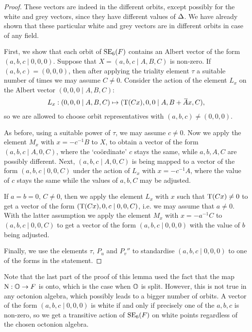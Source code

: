 \begin{proof}
	These vectors are indeed in the different orbits, except possibly for the white 
	and grey vectors, since they have different values of $\Delta$. We have already
	shown that these particular 
	white and grey vectors are in different orbits in case of any field. 
	
	First, we show that each orbit of $\mathrm{SE}_6(F)$ contains an Albert vector of the form
	$(a,b,c\mid 0,0,0)$. Suppose that $X = (a,b,c\mid A,B,C)$ is non-zero. If
	\mbox{$(a,b,c) = (0,0,0)$}, then after applying the triality element $\tau$ a suitable number
	of times we may assume $C \neq 0$. Consider the action of the element $L_x$ on
	the Albert vector $(0,0,0\mid A,B,C)$: 
	\begin{equation*}
		\begin{array}{r@{\;}c@{\;}l}
			L_x: (0,0,0\mid A,B,C) & \mapsto & (\Tr(Cx),0,0\mid A,B+\ovA x, C),
		\end{array}
	\end{equation*}
	so we are allowed to choose orbit representatives with $(a,b,c) \neq (0,0,0)$. 
	
	As before, using a suitable power of $\tau$, we may assume $c \neq 0$. Now we apply 
	the element $M_x$ with $x = -c^{-1}B$ to $X$, to obtain a vector of the form
	\mbox{$(a,b,c\mid A,0,C)$}, where the `co\"{o}rdinate' $c$ stays the same, while 
	$a,b,A,C$ are possibly different. Next,
	$(a,b,c\mid A,0,C)$ is being mapped
	to a vector of the form $(a,b,c\mid 0,0,C)$ under the action of $L_x$ with
	$x = -c^{-1}A$, where the value of $c$ stays the same while the values of 
	$a,b,C$ may be adjusted. 
	
	If $a=b=0$, $C \neq 0$, then we apply the element $L_x$ with $x$ such that 
	\mbox{$\operatorname{T}(Cx)\neq 0$} to get a vector of the form $(\operatorname{T}(Cx),0,c\mid 0,0,C)$, i.e.
	we may assume that \mbox{$a \neq 0$}. With the latter assumption we apply the element
	$M_x$ with $x = -a^{-1} C$ to \mbox{$(a,b,c\mid 0,0,C)$} to get a vector of the form
	$(a,b,c\mid 0,0,0)$ with the value of $b$ being adjusted. 
	
	Finally, we use the elements $\tau$, $P_u$ and $P_v''$ to standardise $(a,b,c\mid 0,0,0)$ to one of the forms in the statement. 
\end{proof}

Note that the last part of the proof of this lemma used the fact that the map
\mbox{$\mathord{\mathrm{N}} : \mathbb{O} \rightarrow F$} is onto, which is the case when $\mathbb{O}$ is split. 
However, this is not true in any octonion algebra, which possibly leads 
to a bigger number of orbits. A vector of the form $(a,b,c\mid 0,0,0)$ is 
white if and only if precisely one of the $a,b,c$ is non-zero, so we get 
a transitive action of $\mathrm{SE}_6(F)$ on white points regardless of the 
chosen octonion algebra. 

